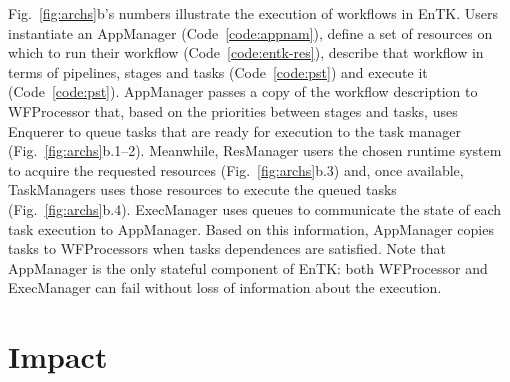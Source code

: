 \documentclass[preprint,12pt, a4paper]{elsarticle}
\begin{document}
Fig.~\ref{fig:archs}b's numbers illustrate the execution of workflows in
EnTK\@. Users instantiate an AppManager (Code~\ref{code:appnam}), define a
set of resources on which to run their workflow (Code~\ref{code:entk-res}),
describe that workflow in terms of pipelines, stages and tasks
(Code~\ref{code:pst}) and execute it (Code~\ref{code:pst}). AppManager passes
a copy of the workflow description to WFProcessor that, based on the
priorities between stages and tasks, uses Enquerer to queue tasks that are
ready for execution to the task manager (Fig.~\ref{fig:archs}b.1--2).
Meanwhile, ResManager users the chosen runtime system to acquire the
requested resources (Fig.~\ref{fig:archs}b.3) and, once available,
TaskManagers uses those resources to execute the queued tasks
(Fig.~\ref{fig:archs}b.4). ExecManager uses queues to communicate the state
of each task execution to AppManager. Based on this information, AppManager
copies tasks to WFProcessors when tasks dependences are satisfied. Note that
AppManager is the only stateful component of EnTK\@: both WFProcessor and
ExecManager can fail without loss of information about the
execution.

\section{Impact}\label{sec:impact}


\end{document}
